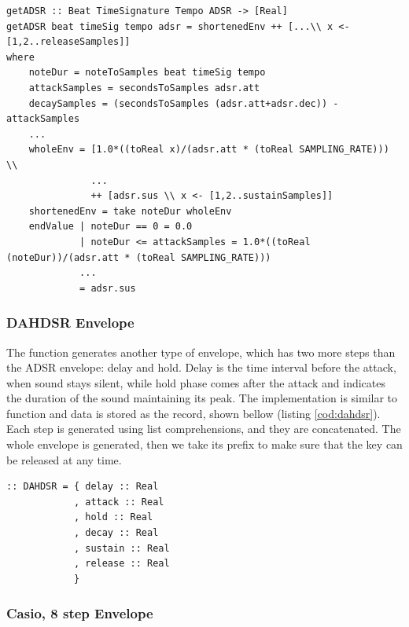 \documentclass[runningheads]{llncs}
\begin{document}
\begin{lstlisting}[language=Clean,label={cod:adsr},caption={The \Cl{getADSR} implementation}, captionpos=b]
getADSR :: Beat TimeSignature Tempo ADSR -> [Real]
getADSR beat timeSig tempo adsr = shortenedEnv ++ [...\\ x <- [1,2..releaseSamples]]
where
	noteDur = noteToSamples beat timeSig tempo
	attackSamples = secondsToSamples adsr.att
	decaySamples = (secondsToSamples (adsr.att+adsr.dec)) - attackSamples
	...
	wholeEnv = [1.0*((toReal x)/(adsr.att * (toReal SAMPLING_RATE))) \\ 
	           ...
	           ++ [adsr.sus \\ x <- [1,2..sustainSamples]]
	shortenedEnv = take noteDur wholeEnv
	endValue | noteDur == 0 = 0.0
			 | noteDur <= attackSamples = 1.0*((toReal (noteDur))/(adsr.att * (toReal SAMPLING_RATE)))
			 ...
			 = adsr.sus  
\end{lstlisting}

\subsubsection{DAHDSR Envelope}

The  function generates another type of envelope, which has two more steps than the ADSR envelope: delay and hold. Delay is the time interval before the attack, when sound stays silent, while hold phase comes after the attack and indicates the duration of the sound maintaining its peak. The implementation is similar to  function and data is stored as the  record, shown bellow (listing \ref{cod:dahdsr}). Each step is generated using list comprehensions, and they are concatenated. The whole envelope is generated, then we take its prefix to make sure that the key can be released at any time.

\begin{lstlisting}[language=Clean,label={cod:dahdsr},caption={The \Cl{DAHDSR} envelope record}, captionpos=b]
:: DAHDSR = { delay :: Real
            , attack :: Real
            , hold :: Real
            , decay :: Real
            , sustain :: Real
            , release :: Real
            }
\end{lstlisting}

\subsubsection{Casio, 8 step Envelope}
\end{document}
